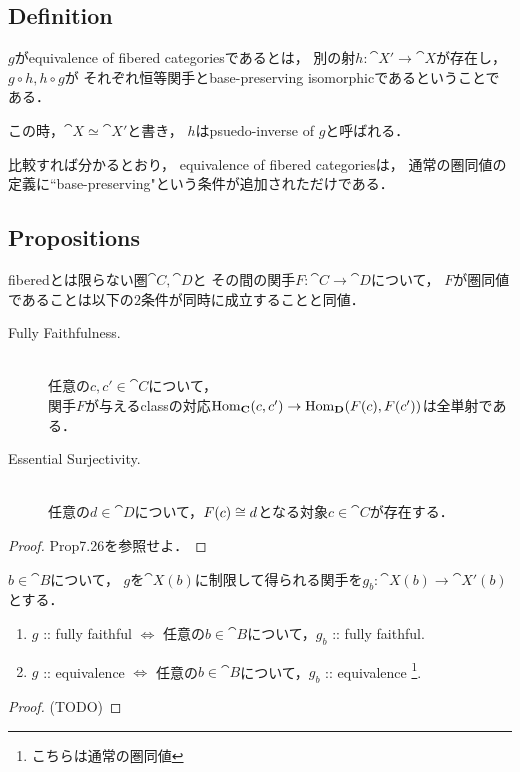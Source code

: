 \documentclass[a4paper, dvipdfmx]{jsarticle}
\begin{document}
\subsection{Definition}
    \begin{Def}[Equivalence]
        $g$がequivalence of fibered categoriesであるとは，
        別の射$h \colon \cat{X}' \to \cat{X}$が存在し，
        $g \circ h, h \circ g$が
        それぞれ恒等関手とbase-preserving isomorphicであるということである．

        この時，$\cat{X} \simeq \cat{X}'$と書き，
        $h$はpsuedo-inverse of $g$と呼ばれる．
    \end{Def}
    \begin{Remark}
        比較すれば分かるとおり，
        equivalence of fibered categoriesは，
        通常の圏同値の定義に``base-preserving"という条件が追加されただけである．
    \end{Remark}

\subsection{Propositions}
    \begin{Prop}
        fiberedとは限らない圏$\cat{C}, \cat{D}$と
        その間の関手$F \colon \cat{C} \to \cat{D}$について，
        $F$が圏同値であることは以下の$2$条件が同時に成立することと同値．
        \begin{description}
            \item[Fully Faithfulness.] \mbox{}\\
                任意の$c,c' \in \cat{C}$について，\mbox{}\\
                関手$F$が与えるclassの対応$\operatorname{Hom}_{\mathbf{C}}(c, c') \to \operatorname{Hom}_{\mathbf{D}}(F(c), F(c'))$は全単射である．

            \item[Essential Surjectivity.] \mbox{}\\
                任意の$d \in \cat{D}$について，$F(c) \cong d$となる対象$c \in \cat{C}$が存在する．
        \end{description}
    \end{Prop}
    \begin{proof}
        \cite{Awodey} Prop7.26を参照せよ．
    \end{proof}

    \begin{Prop}
        $b \in \cat{B}$について，
        $g$を$\cat{X}(b)$に制限して得られる関手を$g_b \colon \cat{X}(b) \to \cat{X}'(b)$とする．
        \begin{enumerate}[label=(\alph*)]
        \item $g$ :: fully faithful
                $\iff$ 任意の$b \in \cat{B}$について，$g_{b}$ :: fully faithful.
        \item $g$ :: equivalence
                $\iff$ 任意の$b \in \cat{B}$について，$g_{b}$ :: equivalence
                    \footnote{こちらは通常の圏同値}.
    \end{enumerate}
    \end{Prop}
    \begin{proof}
        (TODO)
    \end{proof}



\end{document}
